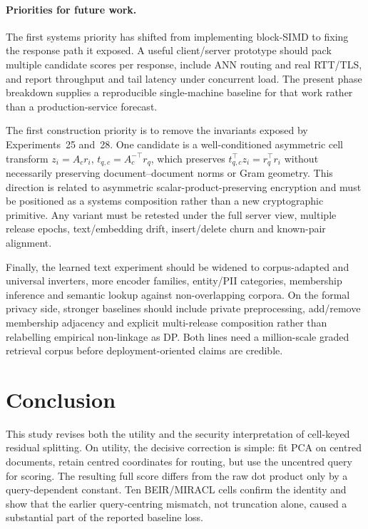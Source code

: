 \documentclass[11pt,a4paper]{article}
\begin{document}
\paragraph{Priorities for future work.}
The first systems priority has shifted from implementing block-SIMD to fixing
the response path it exposed. A useful client/server prototype should pack
multiple candidate scores per response, include ANN routing and real
RTT/TLS, and report throughput and tail latency under concurrent load. The
present phase breakdown supplies a reproducible single-machine baseline for
that work rather than a production-service forecast.

The first construction priority is to remove the invariants exposed by
Experiments~25 and~28. One candidate is a well-conditioned asymmetric cell transform
$z_i=A_c r_i$, $t_{q,c}=A_c^{-\top}r_q$, which preserves
$t_{q,c}^\top z_i=r_q^\top r_i$ without necessarily preserving
document--document norms or Gram geometry. This direction is related to
asymmetric scalar-product-preserving encryption and must be positioned as a
systems composition rather than a new cryptographic primitive. Any variant
must be retested under the full server view, multiple release epochs,
text/embedding drift, insert/delete churn and known-pair alignment.

Finally, the learned text experiment should be widened to corpus-adapted and
universal inverters, more encoder families, entity/PII categories, membership
inference and semantic lookup against non-overlapping corpora. On the formal
privacy side, stronger baselines should include private preprocessing,
add/remove membership adjacency and explicit multi-release composition rather
than relabelling empirical non-linkage as DP. Both lines need a million-scale
graded retrieval corpus before deployment-oriented claims are credible.

\section{Conclusion}\label{sec:conclusion}

This study revises both the utility and the security interpretation of
cell-keyed residual splitting. On utility, the decisive correction is simple:
fit PCA on centred documents, retain centred coordinates for routing, but use
the uncentred query for scoring. The resulting full score differs from the raw
dot product only by a query-dependent constant. Ten BEIR/MIRACL cells confirm
the identity and show that the earlier query-centring mismatch, not truncation
alone, caused a substantial part of the reported baseline loss.
\end{document}
